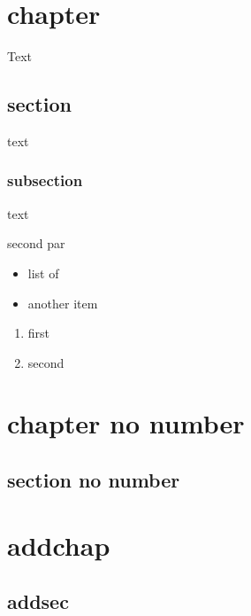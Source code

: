 \documentclass{book}
\begin{document}
\tableofcontents

\chapter{chapter}

Text

\section{section}

text

\subsection{subsection}

text

second par

\begin{itemize}
\item list of
\item another item
\end{itemize}


\begin{enumerate}
\item first
\item second
\end{enumerate}

\chapter*{chapter no number}

\section*{section no number}


\chapter*{addchap}

\section*{addsec}
\end{document}
